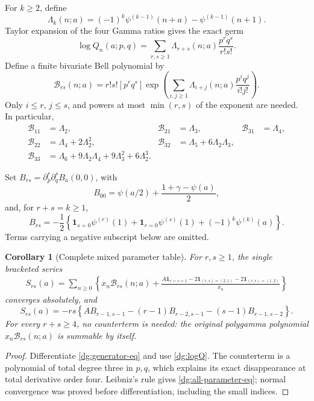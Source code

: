 \documentclass[11pt,a4paper]{article}
\numberwithin{equation}{section}
\newtheorem{corollary}[theorem]{Corollary}
\theoremstyle{definition}
\theoremstyle{remark}
\begin{document}
For $k\geq2$, define
\[
 \Lambda_k(n;a)=(-1)^k\psi^{(k-1)}(n+a)
                                -\psi^{(k-1)}(n+1).
\]
Taylor expansion of the four Gamma ratios gives the exact germ
\begin{equation}
 \log Q_n(a;p,q)=\sum_{r,s\geq1}
       \Lambda_{r+s}(n;a)\frac{p^rq^s}{r!s!}.
 \label{dg:logQ}
\end{equation}
Define a finite bivariate Bell polynomial by
\[
 \mathcal B_{rs}(n;a)=r!s![p^rq^s]
 \exp\left(\sum_{i,j\geq1}
       \Lambda_{i+j}(n;a)\frac{p^iq^j}{i!j!}\right).
\]
Only $i\leq r$, $j\leq s$, and powers at most $\min(r,s)$
of the exponent are needed. In particular,
\begin{align*}
 \mathcal B_{11}&=\Lambda_2,&
 \mathcal B_{21}&=\Lambda_3,&
 \mathcal B_{31}&=\Lambda_4,\\
 \mathcal B_{22}&=\Lambda_4+2\Lambda_2^2,&
 \mathcal B_{32}&=\Lambda_5+6\Lambda_2\Lambda_3,\\
 \mathcal B_{33}&=\Lambda_6+9\Lambda_2\Lambda_4
                            +9\Lambda_3^2+6\Lambda_2^3.
\end{align*}

Set $B_{rs}=\partial_p^r\partial_q^sB_a(0,0)$, with
\[
 B_{00}=\psi(a/2)+\frac{1+\gamma-\psi(a)}2,
\]
and, for $r+s=k\geq1$,
\begin{equation}
 B_{rs}=-\frac12\left\{
 \mathbf1_{s=0}\psi^{(r)}(1)+
 \mathbf1_{r=0}\psi^{(s)}(1)+(-1)^k\psi^{(k)}(a)\right\}.
 \label{dg:B-jets}
\end{equation}
Terms carrying a negative subscript below are omitted.

\begin{corollary}[Complete mixed parameter table]
\label{dg:all-parameter}
For $r,s\geq1$, the single bracketed series
\begin{align}
 S_{rs}(a)=\sum_{n\geq0}\left\{
 x_n\mathcal B_{rs}(n;a)
 +\frac{A\mathbf1_{r=s=1}
  -2\mathbf1_{(r,s)=(2,1)}-2\mathbf1_{(r,s)=(1,2)}}{x_n}
 \right\}
 \label{dg:S}
\end{align}
converges absolutely, and
\begin{equation}
 S_{rs}(a)=-rs\left\{
 A B_{r-1,s-1}-(r-1)B_{r-2,s-1}-(s-1)B_{r-1,s-2}
 \right\}.
 \label{dg:all-parameter-eq}
\end{equation}
For every $r+s\geq4$, no counterterm is needed: the original
polygamma polynomial $x_n\mathcal B_{rs}(n;a)$ is summable by itself.
\end{corollary}
\begin{proof}
Differentiate \eqref{dg:generator-eq} and use
\eqref{dg:logQ}. The counterterm is a polynomial of total
degree three in $p,q$, which explains its exact disappearance at
total derivative order four. Leibniz's rule gives
\eqref{dg:all-parameter-eq}; normal convergence was proved
before differentiation, including the small indices.
\end{proof}
\end{document}
